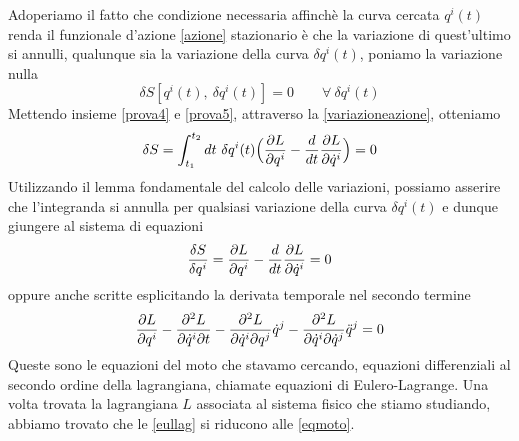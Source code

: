    Adoperiamo il fatto che condizione necessaria affinchè la curva cercata $q^i(t)$ renda il funzionale d'azione \eqref{azione} stazionario è che la variazione di quest'ultimo si annulli, qualunque sia la variazione della curva $\delta q^i(t)$, poniamo la variazione nulla
    \begin{equation} \label{prova5}
        \delta S[q^i(t), ~ \delta q^i(t)] = 0 \qquad \forall ~ \delta q^i(t)
    \end{equation}
    Mettendo insieme \eqref{prova4} e \eqref{prova5}, attraverso la \eqref{variazioneazione}, otteniamo
    \begin{equation*}
        \delta S = \int_{t_1}^{t_2}dt~ \delta q^i(t) \Big (\frac{\partial L}{\partial q^i}  - \frac{d}{dt} \frac{\partial L}{\partial\dot q^i} \Big) = 0
    \end{equation*}
    Utilizzando il lemma fondamentale del calcolo delle variazioni, possiamo asserire che l'integranda si annulla per qualsiasi variazione della curva $\delta q^i(t)$ e dunque giungere al sistema di equazioni
    \begin{equation} \label{eullag}
        \frac{\delta S}{\delta q^i} = \frac{\partial L}{\partial q^i}  - \frac{d}{dt} \frac{\partial L}{\partial\dot q^i} = 0
    \end{equation}
    oppure anche scritte esplicitando la derivata temporale nel secondo termine
    \begin{equation*} 
        \frac{\partial L}{\partial q^i}  - \frac{\partial^2 L}{\partial\dot q^i \partial t} - \frac{\partial^2 L}{\partial\dot q^i \partial q^j} \dot q^j - \frac{\partial^2 L}{\partial\dot q^i \partial\dot q^j} \ddot q^j = 0
    \end{equation*}
    Queste sono le equazioni del moto che stavamo cercando, equazioni differenziali al secondo ordine della lagrangiana, chiamate equazioni di Eulero-Lagrange. Una volta trovata la lagrangiana $L$ associata al sistema fisico che stiamo studiando, abbiamo trovato che le \eqref{eullag} si riducono alle \eqref{eqmoto}.

    \hfill 

